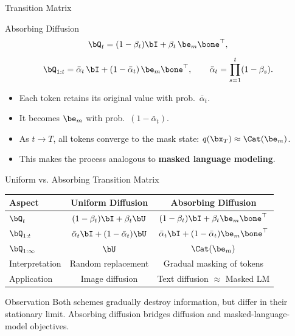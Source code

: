 \documentclass{beamer}
\begin{document}
\begin{frame}{Transition Matrix}

	\begin{block}{Absorbing Diffusion}
		\[
			\bQ_t = (1-\beta_t)\bI + \beta_t\, \be_m \bone^\top,
		\]
		\[
			\bQ_{1:t} = \bar\alpha_t\,\bI + (1-\bar\alpha_t)\,\be_m \bone^\top,
			\qquad
			\bar\alpha_t = \prod_{s=1}^t (1-\beta_s).
		\]
		\eqpause
		\begin{itemize}
			\item Each token retains its original value with prob.~$\bar\alpha_t$.
			\item It becomes $\be_m$ with prob.~$(1 - \bar\alpha_t)$.
			\item As $t \to T$, all tokens converge to the mask state: $q(\bx_T) \approx \Cat(\be_m)$.
			\item This makes the process analogous to \textbf{masked language modeling}.
		\end{itemize}
	\end{block}
\end{frame}
\begin{frame}{Uniform vs. Absorbing Transition Matrix}
	\begin{table}[h!]
		\centering
		\small
		\begin{tabular}{lcc}
			\toprule
			\textbf{Aspect} & \textbf{Uniform Diffusion} & \textbf{Absorbing Diffusion} \\
			\midrule
			$\bQ_t$
				& $(1-\beta_t)\bI + \beta_t \bU$ 
				& $(1-\beta_t)\bI + \beta_t \be_m\bone^\top$ \\[4pt]
			$\bQ_{1:t}$
				& $\bar\alpha_t \bI + (1-\bar\alpha_t)\bU$
				& $\bar\alpha_t \bI + (1-\bar\alpha_t)\be_m\bone^\top$ \\[4pt]
			$\bQ_{1:\infty}$
				& $\bU$
				& $\Cat(\be_m)$ \\[4pt]
			Interpretation
				& Random replacement
				& Gradual masking of tokens \\[4pt]
			Application
				& Image diffusion
				& Text diffusion $\approx$ Masked LM \\[4pt]
			\bottomrule
		\end{tabular}
	\end{table}
	\eqpause
	\begin{block}{Observation}
		Both schemes gradually destroy information, but differ in their stationary limit.
		Absorbing diffusion bridges diffusion and masked-language-model objectives.
	\end{block}
\end{frame}
\end{document}
